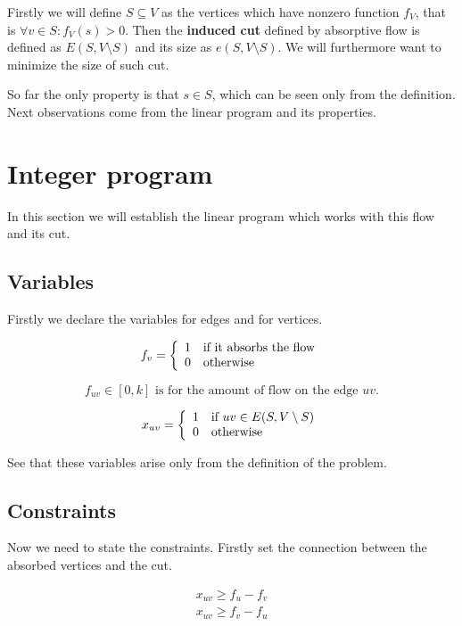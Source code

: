 \documentclass{article}
\theoremstyle{plain}
\theoremstyle{plain}
\theoremstyle{remark}
\begin{document}
	Firstly we will define $S \subseteq V$ as the vertices which have nonzero function $f_V$, that is $\forall v \in S : f_V(s) > 0$. Then the \textbf{induced cut} defined by absorptive flow is defined as $E(S, V \setminus S)$ and its size as $e(S, V \setminus S)$. We will furthermore want to minimize the size of such cut.
	
	So far the only property is that $s \in S$, which can be seen only from the definition. Next observations come from the linear program and its properties.
	
	
	\section{Integer program}
	
	In this section we will establish the linear program which works with this flow and its cut.
	
	\subsection{Variables}
	
	Firstly we declare the variables for edges and for vertices.
	
	$$
	f_v = \left\{\begin{array}{l l}
		1 & \text{if it absorbs the flow} \\
		0 & \text{otherwise}
	\end{array}
	\right.
	$$
	
	$$
	f_{uv} \in [0,k] \text{ is for the amount of flow on the edge } uv.
	$$
	
	$$
	x_{uv} = \left\{\begin{array}{l l}
		1 & \text{if } uv \in E(S, V \setminus S)\\
		0 & \text{otherwise}
	\end{array}
	\right.
	$$
	
	See that these variables arise only from the definition of the problem.
	
	\subsection{Constraints}
	
	Now we need to state the constraints. Firstly set the connection between the absorbed vertices and the cut.
	
	$$
	\begin{array}{c}
		x_{uv} \geq f_u - f_v \\
		x_{uv} \geq f_v - f_u
	\end{array}
	$$
	
\end{document}
